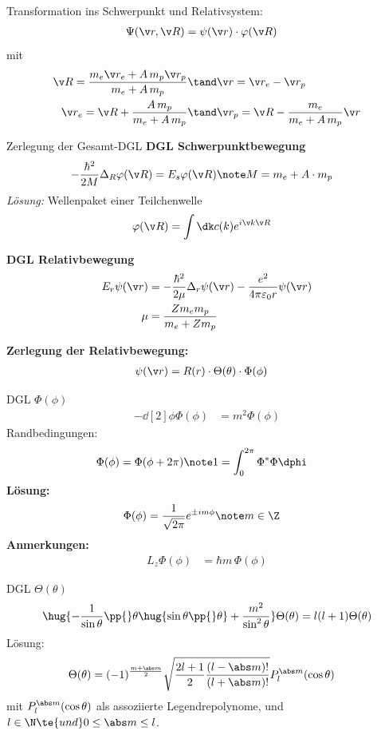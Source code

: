 \documentclass[twocolumn]{summery_4.1}
\begin{document}
Transformation ins Schwerpunkt und Relativsystem:
\begin{align*}
    \Psi(\v r, \v R) &= \psi(\v r)\cdot \varphi(\v R)
\end{align*}
mit 
\begin{align*}
    \v R = \frac{m_e \v r_e + A\, m_p \v r_p}{m_e + A \, m_p}&\tand \v r= \v r_e - \v r_p\\
    \v r_e = \v R + \frac{A\, m_p}{m_e + A\, m_p} &\tand \v r_p = \v R - \frac{m_e}{m_e + A\, m_p} \v r
\end{align*}

{\large Zerlegung der Gesamt-DGL}
{\bf DGL Schwerpunktbewegung}
\begin{align*}
    -\frac{\hbar^2}{2M} \Delta_R \varphi(\v R) &= E_s \varphi(\v R)\note M = m_e +A\cdot m_p
\end{align*}
\textit{Lösung:} Wellenpaket einer Teilchenwelle
\begin{align*}
    \varphi(\v R) &= \int\dk c(k) e^{i\v k \v R}
\end{align*}

{\bf DGL Relativbewegung}
\begin{align*}
    E_r \psi(\v r) &= -\frac{\hbar^2}{2\mu} \Delta_r \psi(\v r) - \frac{e^2}{4\pi\varepsilon_0 r } \psi(\v r) \\
    \mu &= \frac{Z m_e m_p}{m_e + Z m_p}
\end{align*}

\textbf{Zerlegung der Relativbewegung:}
\begin{align*}
    \psi(\v r) &= R(r) \cdot \Theta(\theta) \cdot \Phi(\phi)
\end{align*}

{\large DGL $\Phi(\phi)$}
\begin{align*}
    - \dd[2]{}\phi \Phi(\phi) &= m^2 \Phi(\phi)
\end{align*}
Randbedingungen:
\begin{align*}
    \Phi(\phi) &= \Phi(\phi+2\pi)\note 1 = \int_0^{2\pi} \Phi^* \Phi \dphi
\end{align*}
\textbf{Lösung:}
\begin{align*}
    \Phi(\phi) &= \frac{1}{\sqrt{2\pi}} e^{\pm i m \phi}\note m\in \Z 
\end{align*}
\textbf{Anmerkungen:}
\begin{align*}
    L_z \Phi(\phi) &= \hbar m\, \Phi(\phi)
\end{align*}

{\large DGL $\Theta(\theta)$}
\begin{align*}
    \hug{-\frac{1}{\sin\theta}\pp{}\theta \hug{\sin\theta\pp{}\theta}  + \frac{m^2}{\sin^2\theta}}\Theta(\theta) =  l(l+1)\Theta(\theta)
\end{align*}
Lösung:
\begin{align*}
    \Theta(\theta) &= (-1)^{\frac{m+\abs m}{2}} \sqrt{\frac{2l +1}{2} \frac{(l - \abs m)!}{(l+\abs m)!}} P_l^{\abs m}(\cos\theta) 
\end{align*}
mit \( P_l^{\abs m}(\cos\theta)\) als assoziierte Legendrepolynome, und \( l\in \N\te{ und } 0 \le \abs m \le l\).\\
\end{document}
